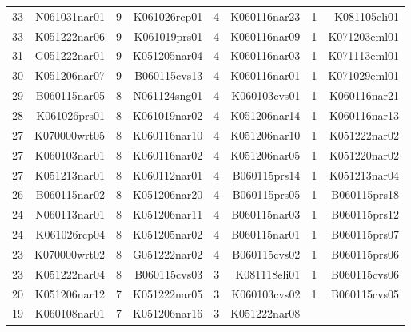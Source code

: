 \begin{table}[p]
\begin{tabular}{rrrrrrrr}
 33 &\ttfamily N061031nar01 & 9  &\ttfamily  K061026rcp01 &4 & \ttfamily K060116nar23 & 1 &\ttfamily K081105eli01\ttfamily \\
 33 &\ttfamily K051222nar06 & 9  &\ttfamily  K061019prs01 &4 & \ttfamily K060116nar09 & 1 &\ttfamily K071203eml01\ttfamily \\
 31 &\ttfamily G051222nar01 & 9  &\ttfamily  K051205nar04 &4 & \ttfamily K060116nar03 & 1 &\ttfamily K071113eml01\ttfamily \\
 30 &\ttfamily K051206nar07 & 9  &\ttfamily  B060115cvs13 &4 & \ttfamily K060116nar01 & 1 &\ttfamily K071029eml01\ttfamily \\
 29 &\ttfamily B060115nar05 & 8  &\ttfamily  N061124sng01 &4 & \ttfamily K060103cvs01 & 1 &\ttfamily K060116nar21\ttfamily \\
 28 &\ttfamily K061026prs01 & 8  &\ttfamily  K061019nar02 &4 & \ttfamily K051206nar14 & 1 &\ttfamily K060116nar13\ttfamily \\
 27 &\ttfamily K070000wrt05 & 8  &\ttfamily  K060116nar10 &4 & \ttfamily K051206nar10 & 1 &\ttfamily K051222nar02\ttfamily \\
 27 &\ttfamily K060103nar01 & 8  &\ttfamily  K060116nar02 &4 & \ttfamily K051206nar05 & 1 &\ttfamily K051220nar02\ttfamily \\
 27 &\ttfamily K051213nar01 & 8  &\ttfamily  K060112nar01 &4 & \ttfamily B060115prs14 & 1 &\ttfamily K051213nar04\ttfamily \\
 26 &\ttfamily B060115nar02 & 8  &\ttfamily  K051206nar20 &4 & \ttfamily B060115prs05 & 1 &\ttfamily B060115prs18\ttfamily \\
 24 &\ttfamily N060113nar01 & 8  &\ttfamily  K051206nar11 &4 & \ttfamily B060115nar03 & 1 &\ttfamily B060115prs12\ttfamily \\
 24 &\ttfamily K061026rcp04 & 8  &\ttfamily  K051205nar02 &4 & \ttfamily B060115nar01 & 1 &\ttfamily B060115prs07\ttfamily \\
 23 &\ttfamily K070000wrt02 & 8  &\ttfamily  G051222nar02 &4 & \ttfamily B060115cvs02 & 1 &\ttfamily B060115prs06\ttfamily \\
 23 &\ttfamily K051222nar04 & 8  &\ttfamily  B060115cvs03 &3 & \ttfamily K081118eli01 & 1 &\ttfamily B060115cvs06\ttfamily \\
 20 &\ttfamily K051206nar12 & 7  &\ttfamily  K051222nar05 &3 & \ttfamily K060103cvs02 & 1 &\ttfamily B060115cvs05\ttfamily \\
 19 &\ttfamily K060108nar01 & 7  &\ttfamily  K051206nar16 &3 & \ttfamily K051222nar08 &   &\ttfamily \\

\end{tabular}
\end{table}

